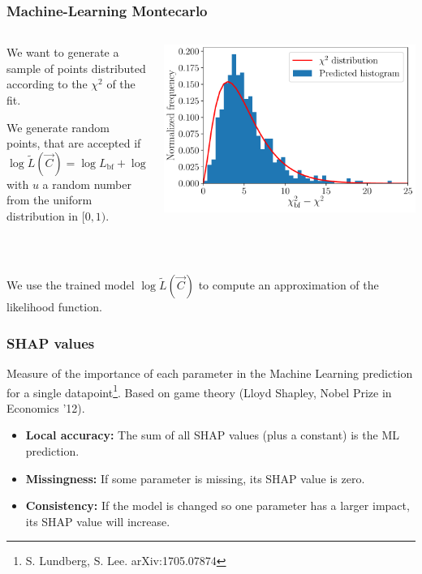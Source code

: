 \documentclass[mathserif, 10pt]{beamer}
\begin{document}
\begin{frame}
    \frametitle{Machine-Learning Montecarlo}
    \begin{columns}
        \begin{column}{0.5\textwidth}
            We want to generate a sample of points distributed according to the $\chi^2$ of the fit.

            We generate random points, that are accepted if
            $$\log \tilde{L}(\vec{C}) = \log L_\mathrm{bf} + \log u\,,$$
            with $u$ a random number from the uniform distribution in $[0,1)$. %
        \end{column}
        \begin{column}{0.5\textwidth}
            \includegraphics[width=\columnwidth]{figures/hist_xgb.pdf}
        \end{column}
    \end{columns}
    
    ~

    We use the trained model $\log\tilde{L}(\vec{C})$ to compute an approximation of the likelihood function.

\end{frame}

\begin{frame}
    \frametitle{SHAP values}

    Measure of the importance of each parameter in the Machine Learning prediction for a single datapoint\footnote[1]{S. Lundberg, S. Lee. arXiv:1705.07874}. Based on game theory (Lloyd Shapley, Nobel Prize in Economics '12).


    \begin{itemize}
        \item \textbf{Local accuracy:} The sum of all SHAP values (plus a constant) is the ML prediction.
        \item \textbf{Missingness:} If some parameter is missing, its SHAP value is zero.
        \item \textbf{Consistency:} If the model is changed so one parameter has a larger impact, its SHAP value will increase.
    \end{itemize}


\end{frame}
\end{document}
